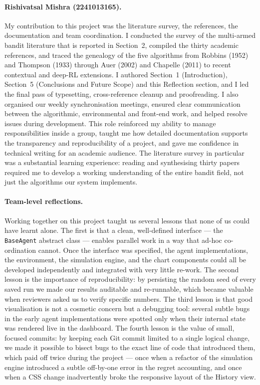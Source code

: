 \paragraph{Rishivatsal Mishra (2241013165).}
My contribution to this project was the literature survey, the references, the documentation and team coordination. I conducted the survey of the multi-armed bandit literature that is reported in Section~2, compiled the thirty academic references, and traced the genealogy of the five algorithms from Robbins (1952) and Thompson (1933) through Auer (2002) and Chapelle (2011) to recent contextual and deep-RL extensions. I authored Section~1 (Introduction), Section~5 (Conclusions and Future Scope) and this Reflection section, and I led the final pass of typesetting, cross-reference cleanup and proofreading. I also organised our weekly synchronisation meetings, ensured clear communication between the algorithmic, environmental and front-end work, and helped resolve issues during development. This role reinforced my ability to manage responsibilities inside a group, taught me how detailed documentation supports the transparency and reproducibility of a project, and gave me confidence in technical writing for an academic audience. The literature survey in particular was a substantial learning experience: reading and synthesising thirty papers required me to develop a working understanding of the entire bandit field, not just the algorithms our system implements.

\paragraph{Team-level reflections.}
Working together on this project taught us several lessons that none of us could have learnt alone. The first is that a clean, well-defined interface --- the \texttt{BaseAgent} abstract class --- enables parallel work in a way that ad-hoc co-ordination cannot. Once the interface was specified, the agent implementations, the environment, the simulation engine, and the chart components could all be developed independently and integrated with very little re-work. The second lesson is the importance of reproducibility: by persisting the random seed of every saved run we made our results auditable and re-runnable, which became valuable when reviewers asked us to verify specific numbers. The third lesson is that good visualisation is not a cosmetic concern but a debugging tool: several subtle bugs in the early agent implementations were spotted only when their internal state was rendered live in the dashboard. The fourth lesson is the value of small, focused commits: by keeping each Git commit limited to a single logical change, we made it possible to bisect bugs to the exact line of code that introduced them, which paid off twice during the project --- once when a refactor of the simulation engine introduced a subtle off-by-one error in the regret accounting, and once when a CSS change inadvertently broke the responsive layout of the History view.

